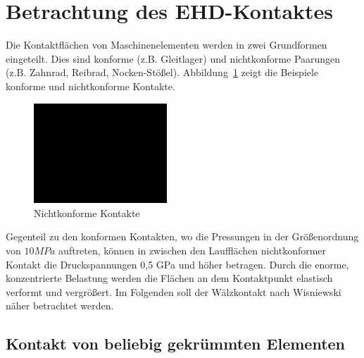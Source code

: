 \section{Betrachtung des EHD-Kontaktes}
\label{sec:betrachtung_des_ehd_kontaktes}

Die Kontaktflächen von Maschinenelementen werden in zwei Grundformen eingeteilt.
Dies sind konforme (z.B. Gleitlager) und nichtkonforme Paarungen (z.B. Zahnrad, Reibrad, Nocken-Stößel).
Abbildung~\ref{fig:nichtkonforme_kontakte} zeigt die Beispiele konforme und nichtkonforme Kontakte.
\begin{figure}[htb]
    \centering
    \includegraphics[width=5cm]{./images/blank_img.jpg}
    \caption{Nichtkonforme Kontakte}
    \label{fig:nichtkonforme_kontakte}
\end{figure}
%
Gegenteil zu den konformen Kontakten, wo die Pressungen in der Größenordnung von $10 MPa$ auftreten, können in zwischen den Laufflächen nichtkonformer Kontakt die Druckspannungen 0,5 GPa und höher betragen.
Durch die enorme, konzentrierte Belastung werden die Flächen an dem Kontaktpunkt elastisch verformt und vergrößert.
Im Folgenden soll der Wälzkontakt nach Wisniewski\cite{wisniewski} näher betrachtet werden.

\subsection*{Kontakt von beliebig gekrümmten Elementen}
\label{sub:kontakt_von_beliebig_gekruemmten_elementen}

